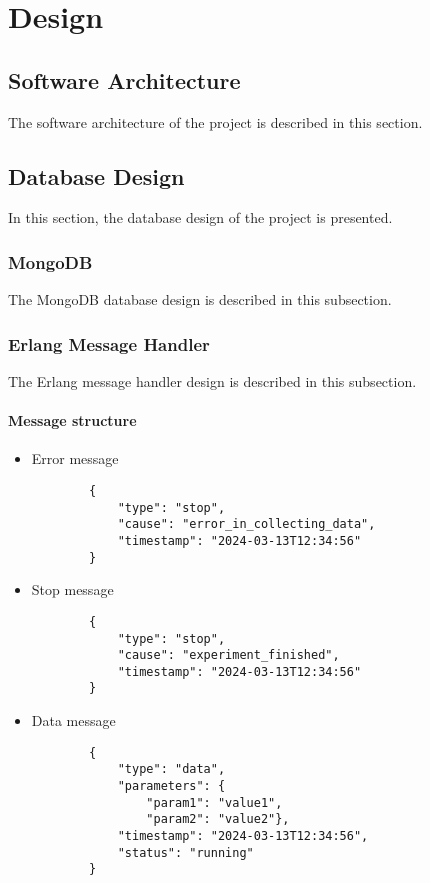 \chapter{Design}

\section{Software Architecture}

The software architecture of the project is described in this section.

\section{Database Design}

In this section, the database design of the project is presented.

\subsection{MongoDB}

The MongoDB database design is described in this subsection.
\newpage
\subsection{Erlang Message Handler}

The Erlang message handler design is described in this subsection.

\subsubsection{Message structure}
\begin{itemize}
    \item Error message \begin{verbatim}
        {
            "type": "stop",
            "cause": "error_in_collecting_data",
            "timestamp": "2024-03-13T12:34:56"
        }
    \end{verbatim}
    \item Stop message \begin{verbatim}
        {
            "type": "stop",
            "cause": "experiment_finished",
            "timestamp": "2024-03-13T12:34:56"
        }
    \end{verbatim}
    \item Data message \begin{verbatim}
        {   
            "type": "data",
            "parameters": {
                "param1": "value1",
                "param2": "value2"},
            "timestamp": "2024-03-13T12:34:56",
            "status": "running"
        }
    \end{verbatim}
\end{itemize}


